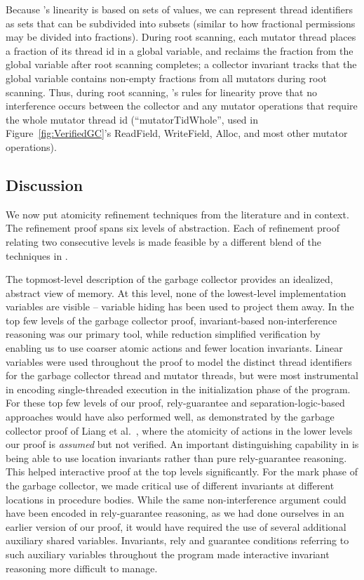 Because \civl's linearity is based on sets of values,
we can represent thread identifiers as sets that can be subdivided into subsets
(similar to how fractional permissions may be divided into fractions).
During root scanning, each mutator thread places a fraction of its thread id in a global variable,
and reclaims the fraction from the global variable after root scanning completes;
a collector invariant tracks that the global variable contains non-empty fractions from all mutators during root scanning.
Thus, during root scanning, \civl's rules for linearity prove that no interference occurs
between the collector and any mutator operations that require the whole mutator thread id
(``mutatorTidWhole'', used in Figure~\ref{fig:VerifiedGC}'s ReadField, WriteField, Alloc,
and most other mutator operations).

\subsection{Discussion}
We now put atomicity refinement techniques from the literature and \civl in context.
The refinement proof spans six levels of abstraction. 
Each of refinement proof relating two consecutive levels is made feasible by a different
blend of the techniques in \civl. 

The topmost-level description of the garbage collector provides an
idealized, abstract view of memory. 
At this level, none of the lowest-level implementation variables are
visible -- variable hiding has been used to project them away. 
In the top few levels of the garbage collector proof, invariant-based
non-interference reasoning was our primary tool, while reduction
simplified verification by enabling us to use coarser atomic actions and fewer
location invariants.  
Linear variables were used throughout the proof to model the distinct
thread identifiers for the garbage collector thread and mutator
threads, but were most instrumental in encoding single-threaded
execution in the initialization phase of the program. 
For these top few levels of our proof, rely-guarantee and separation-logic-based
approaches would have also performed well, as demonstrated by the
garbage collector proof of Liang et al.~\cite{LiangRGSim}, where
the atomicity of actions in the lower levels our proof is {\em assumed} but not verified.
An important distinguishing capability in \civl is being able to use location invariants rather than pure rely-guarantee reasoning.
This helped interactive proof at the top levels significantly.
For the mark phase of the garbage collector, we made critical use of
different invariants at different locations in procedure bodies. 
While the same non-interference argument could have been encoded in
rely-guarantee reasoning, as we had done ourselves in an earlier
version of our proof, 
it would have required the use of several additional auxiliary shared variables. 
Invariants, rely and guarantee conditions referring to such auxiliary
variables throughout the program made interactive invariant reasoning more difficult to manage. 

